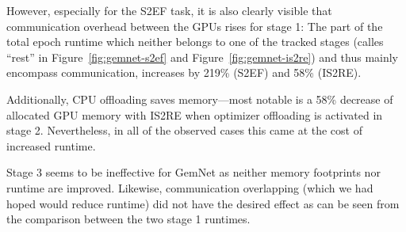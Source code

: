 However, especially for the S2EF task, it is also clearly visible that communication overhead 
between the GPUs rises for stage 1: The part of the total epoch runtime which
neither belongs to one of the tracked stages (calles \enquote{rest} in 
Figure~\ref{fig:gemnet-s2ef} and Figure~\ref{fig:gemnet-is2re}) and thus mainly 
encompass communication, increases by 219\% (S2EF) and 58\% (IS2RE).

Additionally, CPU offloading saves memory---most notable is a 58\% decrease of allocated GPU 
memory with IS2RE when optimizer offloading is activated in stage 2. Nevertheless,
in all of the observed cases this came at the cost of increased runtime.

Stage 3 seems to be ineffective for GemNet as neither memory footprints nor 
runtime are improved. Likewise, communication overlapping (which we had hoped would
reduce runtime) did not have the desired effect as can be seen from the comparison 
between the two stage 1 runtimes.

